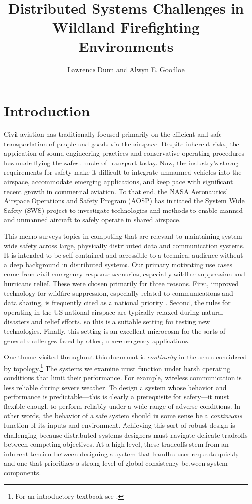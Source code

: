 \documentclass[]             %
{NASA}                       %
\title{Distributed Systems Challenges in Wildland Firefighting Environments}
\author{Lawrence Dunn and Alwyn E. Goodloe}
\theoremstyle{definition}
\begin{document}
\newpage
\setcounter{tocdepth}{2}
\tableofcontents
\newpage

\section{Introduction}
\label{sec:introduction}
Civil aviation has traditionally focused primarily on the efficient
and safe transportation of people and goods via the airspace. Despite
inherent risks, the application of sound engineering practices and
conservative operating procedures has made flying the safest mode of
transport today. Now, the industry's strong requirements for safety
make it difficult to integrate unmanned vehicles into the airspace,
accommodate emerging applications, and keep pace with significant
recent growth in commercial aviation. To that end, the NASA
Aeronautics' Airspace Operations and Safety Program (AOSP) has
initiated the System Wide Safety (SWS) project to investigate
technologies and methods to enable manned and unmanned aircraft to
safely operate in shared airspace.

This memo surveys topics in computing that are relevant to maintaining
system-wide safety across large, physically distributed data and
communication systems. It is intended to be self-contained and
accessible to a technical audience without a deep background in
distributed systems. Our primary motivating use cases come from civil
emergency response scenarios, especially wildfire suppression and
hurricane relief. These were chosen primarily for three
reasons. First, improved technology for wildfire suppression,
especially related to communications and data sharing, is frequently
cited as a national priority \cite{pcast2023}.  Second, the rules for
operating in the US national airspace are typically relaxed during
natural disasters and relief efforts, so this is a suitable setting
for testing new technologies. Finally, this setting is an excellent
microcosm for the sorts of general challenges faced by other,
non-emergency applications.

One theme visited throughout this document is \emph{continuity} in the
sense considered by topology.\footnote{For an introductory textbook
  see \cite{mendelson2012introduction}.}  The systems we examine must
function under harsh operating conditions that limit their
performance. For example, wireless communication is less reliable
during severe weather. To design a system whose behavior and
performance is predictable---this is clearly a prerequisite for
safety---it must flexible enough to perform reliably under a wide
range of adverse conditions. In other words, the behavior of a safe
system should in some sense be a \emph{continuous} function of its
inputs and environment. Achieving this sort of robust design is
challenging because distributed systems designers must navigate
delicate tradeoffs between competing objectives. At a high level,
these tradeoffs stem from an inherent tension between designing a
system that handles user requests quickly and one that prioritizes a
strong level of global consistency between system components.
\end{document}
